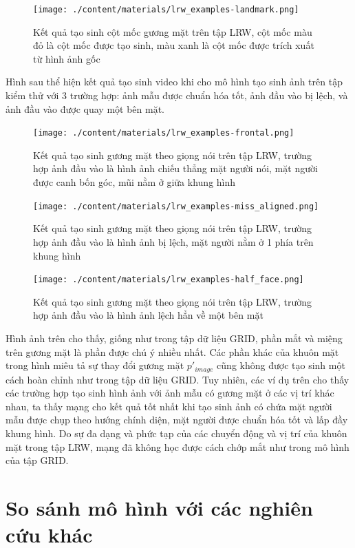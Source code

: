\begin{figure}[H]
    \centering
    \texttt{[image: ./content/materials/lrw\_examples-landmark.png]}
    \caption{Kết quả tạo sinh cột mốc gương mặt trên tập LRW, cột mốc màu đỏ là cột mốc được tạo sinh, màu xanh là cột mốc được trích xuất từ hình ảnh gốc}
\end{figure}

Hình sau thể hiện kết quả tạo sinh video khi cho mô hình tạo sinh ảnh trên tập kiểm thử với 3 trường hợp: ảnh mẫu được chuẩn hóa tốt, ảnh đầu vào bị lệch, và ảnh đầu vào được quay một bên mặt.

\begin{figure}[H]
    \centering
    \texttt{[image: ./content/materials/lrw\_examples-frontal.png]}
    \caption{Kết quả tạo sinh gương mặt theo giọng nói trên tập LRW, trường hợp ảnh đầu vào là hình ảnh chiếu thẳng mặt người nói, mặt người được canh bốn góc, mũi nằm ở giữa khung hình}
\end{figure}

\begin{figure}[H]
    \centering
    \texttt{[image: ./content/materials/lrw\_examples-miss\_aligned.png]}
    \caption{Kết quả tạo sinh gương mặt theo giọng nói trên tập LRW, trường hợp ảnh đầu vào là hình ảnh bị lệch, mặt người nằm ở 1 phía trên khung hình}
\end{figure}

\begin{figure}[H]
    \centering
    \texttt{[image: ./content/materials/lrw\_examples-half\_face.png]}
    \caption{Kết quả tạo sinh gương mặt theo giọng nói trên tập LRW, trường hợp ảnh đầu vào là hình ảnh lệch hẳn về một bên mặt}
\end{figure}

Hình ảnh trên cho thấy, giống như trong tập dữ liệu GRID, phần mắt và miệng trên gương mặt là phần được chú ý nhiều nhất. Các phần khác của khuôn mặt trong hình miêu tả sự thay đổi gương mặt $p'_{image}$ cũng không được tạo sinh một cách hoàn chỉnh như trong tập dữ liệu GRID. Tuy nhiên, các ví dụ trên cho thấy các trường hợp tạo sinh hình ảnh với ảnh mẫu có gương mặt ở các vị trí khác nhau, ta thấy mạng cho kết quả tốt nhất khi tạo sinh ảnh có chứa mặt người mẫu được chụp theo hướng chính diện, mặt người được chuẩn hóa tốt và lấp đầy khung hình. Do sự đa dạng và phức tạp của các chuyển động và vị trí của khuôn mặt trong tập LRW, mạng đã không học được cách chớp mắt như trong mô hình của tập GRID.

\section{So sánh mô hình với các nghiên cứu khác}

